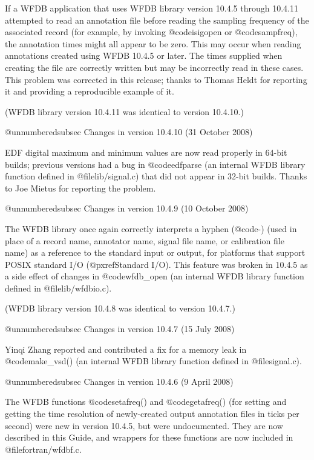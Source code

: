 {{{{{{{{If a WFDB application that uses WFDB library version 10.4.5 through 10.4.11
attempted to read an annotation file before reading the sampling frequency of
the associated record (for example, by invoking @code{isigopen} or
@code{sampfreq}), the annotation times might all appear to be zero.  This may
occur when reading annotations created using WFDB 10.4.5 or later.  The times
supplied when creating the file are correctly written but may be incorrectly
read in these cases.  This problem was corrected in this release; thanks to
Thomas Heldt for reporting it and providing a reproducible example of it.

(WFDB library version 10.4.11 was identical to version 10.4.10.)

@unnumberedsubsec Changes in version 10.4.10 (31 October 2008)

EDF digital maximum and minimum values are now read properly in 64-bit
builds;  previous versions had a bug in @code{edfparse} (an internal WFDB
library function defined in @file{lib/signal.c}) that did not appear in
32-bit builds.	Thanks to Joe Mietus for reporting the problem.

@unnumberedsubsec Changes in version 10.4.9 (10 October 2008)

The WFDB library once again correctly interprets a hyphen (@code{-})
(used in place of a record name, annotator name, signal file name,
or calibration file name) as a reference to the standard input or
output, for platforms that support POSIX standard I/O (@pxref{Standard I/O}).
This feature was broken in 10.4.5 as a side effect of changes
in @code{wfdb_open} (an internal WFDB library function defined in
@file{lib/wfdbio.c}).

(WFDB library version 10.4.8 was identical to version 10.4.7.)

@unnumberedsubsec Changes in version 10.4.7 (15 July 2008)

Yinqi Zhang reported and contributed a fix for a memory leak in
@code{make_vsd()} (an internal WFDB library function defined in
@file{signal.c}).

@unnumberedsubsec Changes in version 10.4.6 (9 April 2008)

The WFDB functions @code{setafreq()} and @code{getafreq()} (for
setting and getting the time resolution of newly-created output
annotation files in ticks per second) were new in version 10.4.5, but
were undocumented.  They are now described in this Guide, and wrappers
for these functions are now included in @file{fortran/wfdbf.c}.

}}}}}}}}
